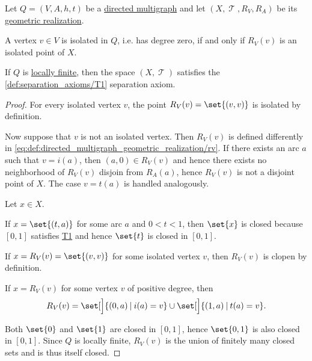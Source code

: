 \begin{proposition}\label{thm:def:directed_multigraph_geometric_realization}
  Let \( Q = (V, A, h, t) \) be a \hyperref[def:directed_multigraph]{directed multigraph} and let \( (X, \mscrT, R_V, R_A) \) be its \hyperref[def:directed_multigraph_geometric_realization]{geometric realization}.

  \begin{thmenum}
     A vertex \( v \in V \) is isolated in \( Q \), i.e. has degree zero, if and only if \( R_V(v) \) is an isolated point of \( X \).

     If \( Q \) is \hyperref[def:hypergraph/degree]{locally finite}, then the space \( (X, \mscrT) \) satisfies the \ref{def:separation_axioms/T1} separation axiom.
  \end{thmenum}
\end{proposition}
\begin{proof}
   For every isolated vertex \( v \), the point \( R_V(v) = \set{ (v, v) } \) is isolated by definition.

  Now suppose that \( v \) is not an isolated vertex. Then \( R_V(v) \) is defined differently in \eqref{eq:def:directed_multigraph_geometric_realization/rv}. If there exists an arc \( a \) such that \( v = i(a) \), then \( (a, 0) \in R_V(v) \) and hence there exists no neighborhood of \( R_V(v) \) disjoin from \( R_A(a) \), hence \( R_V(v) \) is not a disjoint point of \( X \). The case \( v = t(a) \) is handled analogously.

   Let \( x \in X \).

  If \( x = \set{ (t, a) } \) for some arc \( a \) and \( 0 < t < 1 \), then \( \set{ x } \) is closed because \( [0, 1] \) satisfies \hyperref[def:separation_axioms/T1]{T1} and hence \( \set{ t } \) is closed in \( [0, 1] \).

  If \( x = R_V(v) = \set{ (v, v) } \) for some isolated vertex \( v \), then \( R_V(v) \) is clopen by definition.

  If \( x = R_V(v) \) for some vertex \( v \) of positive degree, then
  \begin{equation*}
    R_V(v) = \set[\Big]{ (0, a) \given i(a) = v } \cup \set[\Big]{ (1, a) \given t(a) = v }.
  \end{equation*}

  Both \( \set{ 0 } \) and \( \set{ 1 } \) are closed in \( [0, 1] \), hence \( \set{ 0, 1 } \) is also closed in \( [0, 1] \). Since \( Q \) is locally finite, \( R_V(v) \) is the union of finitely many closed sets and is thus itself closed.
\end{proof}

